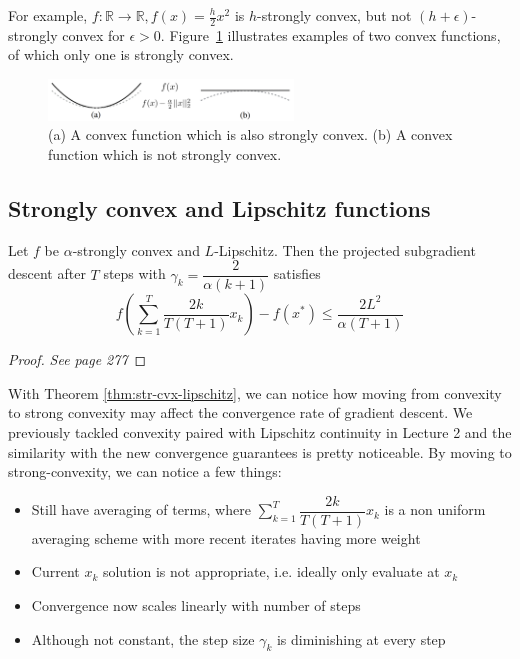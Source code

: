 \documentclass{article}
\newcommand{\R}{\mathbb{R}}
\begin{document}
For example, $f:\R\to\R, f(x) = \frac{h}{2} x^2$ is $h$-strongly convex, but not $(h+\epsilon)$-strongly convex for $\epsilon>0$. Figure~\ref{str_convex} illustrates examples of two convex functions, of which only one is strongly convex.\\

\begin{figure}[ht]
\centering
    \includegraphics[width=0.58\textwidth]{str_convex.png}%
    \caption{(a) A convex function which is also strongly convex. (b) A convex function which is not strongly convex.}
    \label{str_convex}
\end{figure}




\subsection{Strongly convex and Lipschitz functions}
\begin{thm}\label{thm:str-cvx-lipschitz}
	Let $f$ be $\alpha$-strongly convex and $L$-Lipschitz. Then the projected subgradient descent after $T$ steps with $\gamma_k = \dfrac{2}{\alpha(k+1)}$ satisfies  
\[
	f\left(\sum_{k=1}^T \dfrac{2k}{T(T+1)} x_k \right) - f(x^{*}) \leq \frac{2 L^2}{\alpha(T+1)}
\]
\end{thm}

\begin{proof}
\textit{See \cite{bubeck2015convex} page 277}
\end{proof}

With Theorem \ref{thm:str-cvx-lipschitz}, we can notice how moving from convexity to strong convexity may affect the convergence rate of gradient descent. We previously tackled convexity paired with Lipschitz continuity in Lecture 2 and the similarity with the new convergence guarantees is pretty noticeable. By moving to strong-convexity, we can notice a few things:
\begin{itemize}
    \item Still have averaging of terms, where $\sum\limits_{k=1}^T \dfrac{2k}{T(T+1)} x_k$ is a non uniform averaging scheme with more recent iterates having more weight
    \item Current $x_k$ solution is not appropriate, i.e. ideally only evaluate at $x_k$
    \item Convergence now scales linearly with number of steps
    \item Although not constant, the step size $\gamma_k$ is diminishing at every step
\end{itemize}
\end{document}
